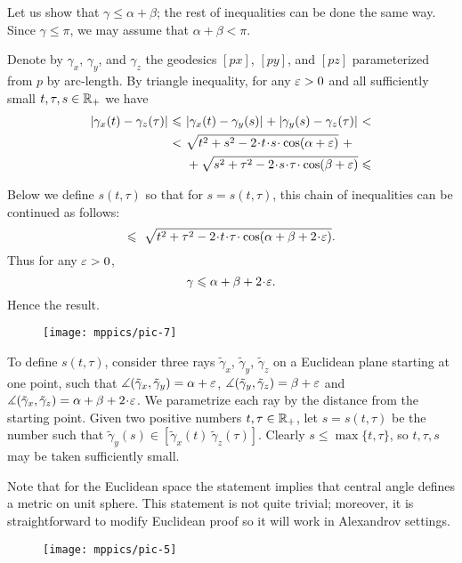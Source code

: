 

Let us show that $\gamma\le\alpha+\beta$; the rest of inequalities can be done the same way.
Since $\gamma\le\pi$, we may assume that $\alpha+\beta< \pi$.

Denote by $\gamma_x$, $\gamma_y$, and $\gamma_z$ the geodesics $[px]$, $[py]$, and $[pz]$ parameterized from $p$ by arc-length.
By triangle inequality,
for any $\varepsilon>0$ and all sufficiently small $t,\tau,s\in\mathbb{R}_+$ we have
\begin{align*}
\dist{\gamma_x(t)}{\gamma_z(\tau)}{}
\le 
\ &\dist{\gamma_x(t)}{\gamma_y(s)}{}+\dist{\gamma_y(s)}{\gamma_z(\tau)}{}<\\
<
\ &\sqrt{t^2+s^2-2\cdot t\cdot  s\cdot \cos(\alpha+\eps)}\ +
\\
&+\sqrt{s^2+\tau^2-2\cdot s\cdot \tau\cdot \cos(\beta+\eps)}\le
\end{align*}

Below we define 
$s(t,\tau)$ so that for 
$s=s(t,\tau)$, this chain of inequalities can be continued as follows:
\[\le
\ \sqrt{t^2+\tau^2-2\cdot t\cdot \tau\cdot \cos(\alpha+\beta+2\cdot \eps)}.
\]
Thus for any $\varepsilon>0$, 
\[\gamma\le \alpha+\beta+2\cdot \eps.\]
Hence the result.

\begin{wrapfigure}{o}{30 mm}
\vskip-8mm
\centering
\texttt{[image: mppics/pic-7]}
\end{wrapfigure}

To define $s(t,\tau)$, consider three rays $\tilde \gamma_x$, $\tilde \gamma_y$, $\tilde \gamma_z$ on a Euclidean plane starting at one point, such that $\measuredangle(\tilde \gamma_x,\tilde \gamma_y)=\alpha+\varepsilon$,
$\measuredangle(\tilde \gamma_y,\tilde \gamma_z)=\beta+\varepsilon$ and $\mangle(\tilde \gamma_x,\tilde \gamma_z)=\alpha+\beta+2\cdot \eps$.
We parametrize each ray by the distance from the starting point.
Given two positive numbers $t,\tau\in\mathbb{R}_+$, let $s=s(t,\tau)$ be 
the number such that 
$\tilde \gamma_y(s)\in[\tilde \gamma_x(t)\ \tilde \gamma_z(\tau)]$. 
Clearly $s\le\max\{t,\tau\}$, so $t,\tau,s$ may be taken sufficiently small.

Note that for the Euclidean space the statement implies that central angle defines a metric on unit sphere.
This statement is not quite trivial; moreover, it is straightforward to modify Euclidean proof so it will work in Alexandrov settings. 

\begin{wrapfigure}{o}{30 mm}
\vskip-2mm
\centering
\texttt{[image: mppics/pic-5]}
\end{wrapfigure}

